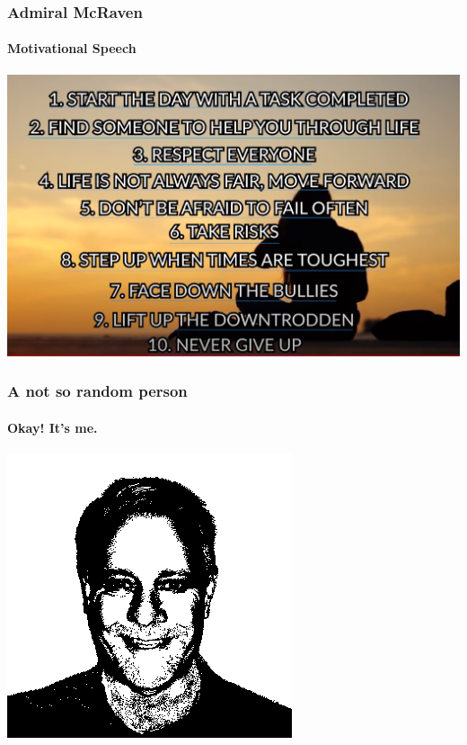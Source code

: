 \documentclass{beamer}
\begin{document}
\begin{frame}
  \frametitle{\hspace{4mm}Admiral McRaven}%
  \framesubtitle{\hspace{4mm}Motivational Speech}%
  \includegraphics[scale=.22]{images/cid-01.png}%
\end{frame}%

\begin{frame}
  \frametitle{\hspace{4mm}A not so random person}%
  \framesubtitle{\hspace{4mm}Okay! It's me.}%
  \includegraphics[scale=.60]{images/cid-02.png}%
\end{frame}%
\end{document}
